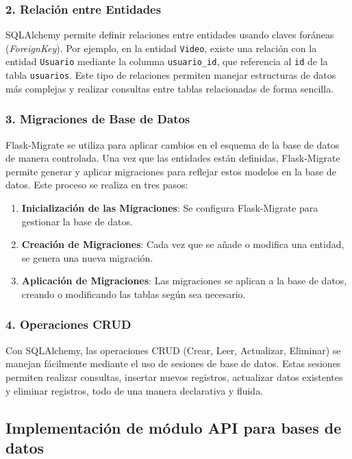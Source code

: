 \subsubsection*{2. Relación entre Entidades}
SQLAlchemy permite definir relaciones entre entidades usando claves foráneas (\textit{ForeignKey}). Por ejemplo, en la entidad \texttt{Video}, existe una relación con la entidad \texttt{Usuario} mediante la columna \texttt{usuario\_id}, que referencia al \texttt{id} de la tabla \texttt{usuarios}. Este tipo de relaciones permiten manejar estructuras de datos más complejas y realizar consultas entre tablas relacionadas de forma sencilla.

\subsubsection*{3. Migraciones de Base de Datos}
Flask-Migrate se utiliza para aplicar cambios en el esquema de la base de datos de manera controlada. Una vez que las entidades están definidas, Flask-Migrate permite generar y aplicar migraciones para reflejar estos modelos en la base de datos. Este proceso se realiza en tres pasos:

\begin{enumerate}[label=\alph*.]
    \item \textbf{Inicialización de las Migraciones}: Se configura Flask-Migrate para gestionar la base de datos.
    \item \textbf{Creación de Migraciones}: Cada vez que se añade o modifica una entidad, se genera una nueva migración.
    \item \textbf{Aplicación de Migraciones}: Las migraciones se aplican a la base de datos, creando o modificando las tablas según sea necesario.
\end{enumerate}

\subsubsection*{4. Operaciones CRUD}
Con SQLAlchemy, las operaciones CRUD (Crear, Leer, Actualizar, Eliminar) se manejan fácilmente mediante el uso de sesiones de base de datos. Estas sesiones permiten realizar consultas, insertar nuevos registros, actualizar datos existentes y eliminar registros, todo de una manera declarativa y fluida.

\subsection{Implementación de módulo API para bases de datos}

